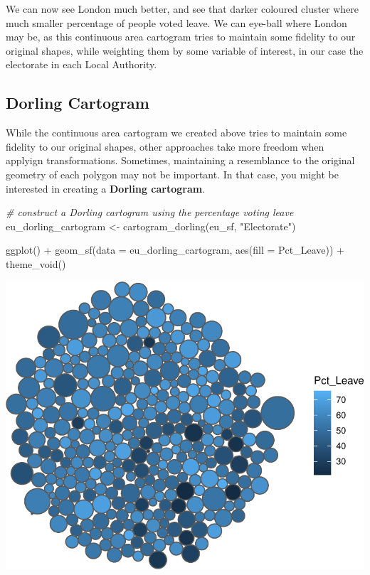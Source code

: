 \documentclass[
]{book}
\makeatletter
\newenvironment{Shaded}{\begin{snugshade}}{\end{snugshade}}
\newcommand{\AttributeTok}[1]{\textcolor[rgb]{0.61,0.61,0.61}{#1}}
\newcommand{\CommentTok}[1]{\textcolor[rgb]{0.37,0.37,0.37}{\textit{#1}}}
\newcommand{\FunctionTok}[1]{\textcolor[rgb]{0,0,0}{#1}}
\newcommand{\NormalTok}[1]{#1}
\newcommand{\OtherTok}[1]{\textcolor[rgb]{0.37,0.37,0.37}{#1}}
\newcommand{\SpecialCharTok}[1]{\textcolor[rgb]{0,0,0}{#1}}
\newcommand{\StringTok}[1]{\textcolor[rgb]{0.5,0.5,0.5}{#1}}
\newenvironment{kframe}{%
\medskip{}
\setlength{\fboxsep}{.8em}
 \def\at@end@of@kframe{}%
 \ifinner\ifhmode%
  \def\at@end@of@kframe{\end{minipage}}%
  \begin{minipage}{\columnwidth}%
 \fi\fi%
 \def\FrameCommand##1{\hskip\@totalleftmargin \hskip-\fboxsep
 \colorbox{shadecolor}{##1}\hskip-\fboxsep
     \hskip-\linewidth \hskip-\@totalleftmargin \hskip\columnwidth}%
 \MakeFramed {\advance\hsize-\width
   \@totalleftmargin\z@ \linewidth\hsize
   \@setminipage}}%
 {\par\unskip\endMakeFramed%
 \at@end@of@kframe}
\renewenvironment{Shaded}{\begin{kframe}}{\end{kframe}}
\makeatother
\begin{document}
We can now see London much better, and see that darker coloured cluster where much smaller percentage of people voted leave. We can eye-ball where London may be, as this continuous area cartogram tries to maintain some fidelity to our original shapes, while weighting them by some variable of interest, in our case the electorate in each Local Authority.

\hypertarget{dorling-cartogram}{%
\subsection{Dorling Cartogram}\label{dorling-cartogram}}

While the continuous area cartogram we created above tries to maintain some fidelity to our original shapes, other approaches take more freedom when applyign transformations. Sometimes, maintaining a resemblance to the original geometry of each polygon may not be important. In that case, you might be interested in creating a \textbf{Dorling cartogram}.

\begin{Shaded}
\begin{Highlighting}[]
\CommentTok{\# construct a Dorling cartogram using the percentage voting leave}
\NormalTok{eu\_dorling\_cartogram }\OtherTok{\textless{}{-}} \FunctionTok{cartogram\_dorling}\NormalTok{(eu\_sf, }\StringTok{"Electorate"}\NormalTok{)}
\end{Highlighting}
\end{Shaded}

\begin{Shaded}
\begin{Highlighting}[]
\FunctionTok{ggplot}\NormalTok{() }\SpecialCharTok{+}
  \FunctionTok{geom\_sf}\NormalTok{(}\AttributeTok{data =}\NormalTok{ eu\_dorling\_cartogram, }\FunctionTok{aes}\NormalTok{(}\AttributeTok{fill =}\NormalTok{ Pct\_Leave)) }\SpecialCharTok{+} 
  \FunctionTok{theme\_void}\NormalTok{()}
\end{Highlighting}
\end{Shaded}

\includegraphics{crime_mapping_files/figure-latex/unnamed-chunk-139-1.pdf}
\end{document}
